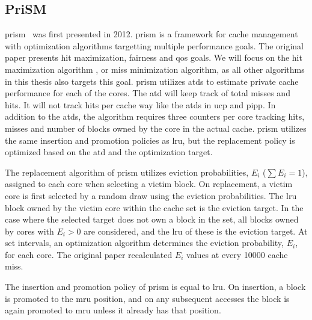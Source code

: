 \subsection{PriSM}
\label{sec:algorithms:prism}

\gls{prism}~\cite{Manikantan2012} was first presented in 2012.
\gls{prism} is a framework for cache management with optimization algorithms targetting multiple performance goals.
The original paper presents hit maximization, fairness and \gls{qos} goals.
We will focus on the hit maximization algorithm , or miss minimization algorithm, as all other algorithms in this thesis also targets this goal.
\gls{prism} utilizes \glspl{atd} to estimate private cache performance for each of the cores.
The \gls{atd} will keep track of total misses and hits.
It will not track hits per cache way like the \glspl{atd} in \gls{ucp} and \gls{pipp}.
In addition to the \glspl{atd}, the algorithm requires three counters per core tracking hits, misses and number of blocks owned by the core in the actual cache.
\gls{prism} utilizes the same insertion and promotion policies as \gls{lru}, but the replacement policy is optimized based on the \gls{atd} and the optimization target.

The replacement algorithm of \gls{prism} utilizes eviction probabilities, $E_i$ ($\sum{E_i} = 1$), assigned to each core when selecting a victim block.
On replacement, a victim core is first selected by a random draw using the eviction probabilities.
The \gls{lru} block owned by the victim core within the cache set is the eviction target.
In the case where the selected target does not own a block in the set, all blocks owned by cores with $E_i > 0$ are considered, and the \gls{lru} of these is the eviction target.
At set intervals, an optimization algorithm determines the eviction probability, $E_i$, for each core.
The original paper recalculated $E_i$ values at every 10000 cache miss.

The insertion and promotion policy of \gls{prism} is equal to \gls{lru}.
On insertion, a block is promoted to the \gls{mru} position, and on any subsequent accesses the block is again promoted to \gls{mru} unless it already has that position.

